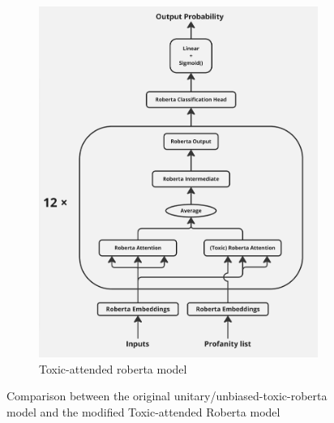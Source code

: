\begin{figure}[t]
\begin{subfigure}[h]{0.47\linewidth}
        \includegraphics[width=\linewidth]{Images/Screenshot_20241023_113521_Miro.jpg}
        \caption{Toxic-attended roberta model}
        \label{fig:modified-model}
    \end{subfigure}
    \caption{Comparison between the original unitary/unbiased-toxic-roberta model and the modified Toxic-attended Roberta model}
    \label{fig:models-diff}
\end{figure}




